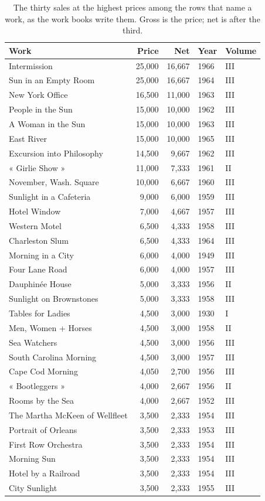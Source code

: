 \begin{table}[htbp]\centering\small
\caption{The thirty sales at the highest prices among the rows that name a work, as the work books write them. Gross is the price; net is after the third.}\label{tab:works}
\begin{tabular}{lrrll}\toprule Work & Price & Net & Year & Volume\\\midrule
Intermission & 25,000 & 16,667 & 1966 & III\\
Sun in an Empty Room & 25,000 & 16,667 & 1964 & III\\
New York Office & 16,500 & 11,000 & 1963 & III\\
People in the Sun & 15,000 & 10,000 & 1962 & III\\
A Woman in the Sun & 15,000 & 10,000 & 1963 & III\\
East River & 15,000 & 10,000 & 1965 & III\\
Excursion into Philosophy & 14,500 & 9,667 & 1962 & III\\
« Girlie Show » & 11,000 & 7,333 & 1961 & II\\
November, Wash. Square & 10,000 & 6,667 & 1960 & III\\
Sunlight in a Cafeteria & 9,000 & 6,000 & 1959 & III\\
Hotel Window & 7,000 & 4,667 & 1957 & III\\
Western Motel & 6,500 & 4,333 & 1958 & III\\
Charleston Slum & 6,500 & 4,333 & 1964 & III\\
Morning in a City & 6,000 & 4,000 & 1949 & III\\
Four Lane Road & 6,000 & 4,000 & 1957 & III\\
Dauphinée House & 5,000 & 3,333 & 1956 & II\\
Sunlight on Brownstones & 5,000 & 3,333 & 1958 & III\\
Tables for Ladies & 4,500 & 3,000 & 1930 & I\\
Men, Women + Horses & 4,500 & 3,000 & 1958 & II\\
Sea Watchers & 4,500 & 3,000 & 1956 & III\\
South Carolina Morning & 4,500 & 3,000 & 1957 & III\\
Cape Cod Morning & 4,050 & 2,700 & 1956 & III\\
« Bootleggers » & 4,000 & 2,667 & 1956 & II\\
Rooms by the Sea & 4,000 & 2,667 & 1952 & III\\
The Martha McKeen of Wellfleet & 3,500 & 2,333 & 1954 & III\\
Portrait of Orleans & 3,500 & 2,333 & 1953 & III\\
First Row Orchestra & 3,500 & 2,333 & 1954 & III\\
Morning Sun & 3,500 & 2,333 & 1954 & III\\
Hotel by a Railroad & 3,500 & 2,333 & 1954 & III\\
City Sunlight & 3,500 & 2,333 & 1955 & III\\
\bottomrule\end{tabular}\end{table}

